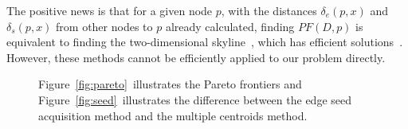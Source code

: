 The positive news is that for a given node $p$, with the distances $\delta_e(p, x)$ and $\delta_s(p, x)$ from other nodes to $p$ already calculated, finding $PF(D, p)$ is equivalent to %
finding the two-dimensional skyline~\cite{borzsony2001skyline}, which has efficient solutions~\cite{khalefa2008skyline,zhiyonghuang2006continuous,papadias2005progressive,kalyvas2017survey}. %
However, these methods cannot be efficiently applied to our problem directly. 



\begin{figure}[!t]
\begin{center}
\caption{Figure~\ref{fig:pareto}~illustrates the Pareto frontiers and Figure~\ref{fig:seed}~illustrates the difference between the edge seed acquisition method and the multiple centroids method.}
\end{center}
\end{figure}

